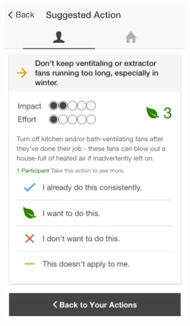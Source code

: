 \begin{figure}[b!]
      \begin{center}
        \begin{minipage}[t!]{0.33\linewidth}
	       \includegraphics[width=1\linewidth]{img/action_details.jpg}
        \end{minipage}
        \begin{minipage}[t!]{0.31\linewidth}

\end{minipage}
\end{center}
\end{figure}
